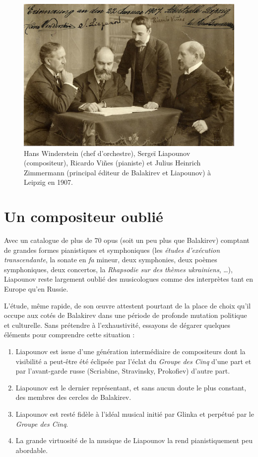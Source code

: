 \begin{figure}[!p]
  \begin{bigcenter}
    \includegraphics[width=14cm, keepaspectratio]{lyapunov-3.jpg}
  \end{bigcenter}
  \caption{\label{liapounov2}Hans Winderstein (chef d'orchestre), Sergeï Liapounov (compositeur), Ricardo Viñes (pianiste) et Julius Heinrich Zimmermann (principal éditeur de Balakirev et Liapounov) à Leipzig en 1907.}
\end{figure}

\newpage

\section{Un compositeur oublié}

Avec un catalogue de plus de 70 opus (soit un peu plus que Balakirev) comptant de grandes formes pianistiques et symphoniques (les \emph{études d'exécution transcendante}, la sonate en \emph{fa} mineur, deux symphonies, deux poèmes symphoniques, deux concertos, la \emph{Rhapsodie sur des thèmes ukrainiens}, \dots), Liapounov reste largement oublié des musicologues comme des interprètes tant en Europe qu'en Russie.

L'étude, même rapide, de son œuvre attestent pourtant de la place de choix qu'il occupe aux cotés de Balakirev dans une période de profonde mutation politique et culturelle. Sans prétendre à l'exhaustivité, essayons de dégarer quelques éléments pour comprendre cette situation :

\begin{enumerate}
  \item Liapounov est issue d'une génération intermédiaire de compositeurs dont la visibilité a peut-être été éclipsée par l'éclat du \emph{Groupe des Cinq} d'une part et par l’avant-garde russe (Scriabine, Stravinsky, Prokofiev) d'autre part.
  \item Liapounov est le dernier représentant, et sans aucun doute le plus constant, des membres des cercles de Balakirev.
  \item Liapounov est resté fidèle à l'idéal musical initié par Glinka et perpétué par le \emph{Groupe des Cinq}.
  \item La grande virtuosité de la musique de Liapounov la rend pianistiquement peu abordable.
\end{enumerate}


